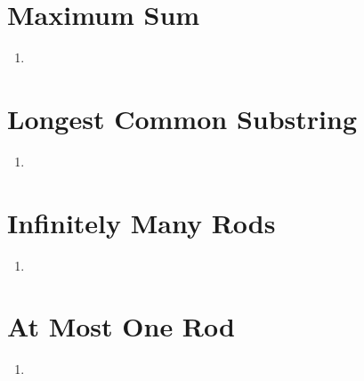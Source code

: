 \documentclass{article}
\begin{document}
\newpage
\section{Maximum Sum}
\begin{enumerate}
    \item 
\end{enumerate}

\newpage
\section{Longest Common Substring}
\begin{enumerate}
    \item 
\end{enumerate}

\newpage
\section{Infinitely Many Rods}
\begin{enumerate}
    \item 
\end{enumerate}

\newpage
\section{At Most One Rod}
\begin{enumerate}
    \item 
\end{enumerate}
\end{document}
